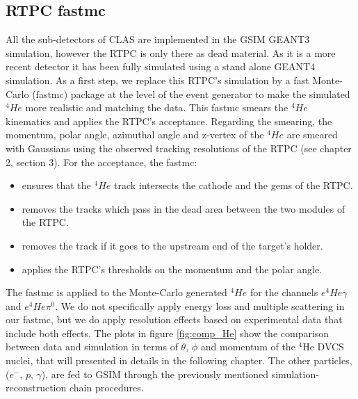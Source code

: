 \subsection{RTPC fastmc}
All the sub-detectors of CLAS are implemented in the GSIM GEANT3 simulation, 
however the RTPC is only there as dead material. As it is a more recent detector
it has been fully simulated using a stand alone GEANT4 simulation. As a 
first step, we replace this RTPC's simulation by a fast Monte-Carlo (fastmc) 
package at the level of the event generator to make the simulated $^{4}He$ more 
realistic and matching the data. This fastmc smears the $^{4}He$ kinematics and 
applies the RTPC's acceptance. Regarding the smearing, the momentum, polar 
angle, azimuthal angle and z-vertex of the $^{4}He$ are smeared with Gaussians 
using the observed tracking resolutions of the RTPC (see chapter 2, section 3).  
For the acceptance, the fastmc:
\begin{itemize}
\item ensures that the $^{4}He$ track intersects the cathode and the gems of the RTPC.
\item removes the tracks which pass in the dead area between the two modules of the RTPC.
\item removes the track if it goes to the upstream end of the target's holder.
\item applies the RTPC's thresholds on the momentum and the polar angle.
\end{itemize} 

The fastmc is applied to the Monte-Carlo generated $^{4}He$ for the channels 
$e^{4}He\gamma$ and $e^{4}He\pi^{0}$. We do not specifically apply energy loss 
and multiple scattering in our fastmc, but we do apply resolution effects based 
on experimental data that include both effects. The plots in figure 
\ref{fig:comp_He} show the comparison between data and simulation in terms of 
$\theta$, $\phi$ and momentum of the $^{4}$He DVCS nuclei, that will presented 
in details in the following chapter. The other particles, ($e^{-}$, $p$, 
$\gamma$), are fed to GSIM through the previously mentioned 
simulation-reconstruction chain procedures.

